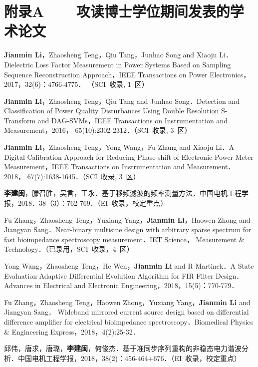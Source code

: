 
\chapter*{附录A~~~~攻读博士学位期间发表的学术论文}
\setlength{\parindent}{0em}
\begin{publist}
	\item \textbf{Jianmin Li}，Zhaosheng Teng，Qiu Tang，Junhao Song and Xiaoju Li．Dielectric Loss Factor Measurement in Power Systems Based on Sampling Sequence Reconstruction Approach，IEEE Transactions on Power Electronics，2017，32(6)：4766-4775． （SCI~收录, 1~区）
	\item \textbf{Jianmin Li}，Zhaosheng Teng，Qiu Tang and Junhao Song．Detection and Classification of Power Quality Disturbances Using Double Resolution S-Transform and DAG-SVMs，IEEE Transactions on Instrumentation and Measurement，2016， 65(10):2302-2312．（SCI~收录, 3~区）
	\item \textbf{Jianmin Li}，Zhaosheng Teng，Yong Wang，Fu Zhang and Xiaoju Li．A Digital Calibration Approach for Reducing Phase-shift of Electronic Power Meter Measurement，IEEE Transactions on Instrumentation and Measurement．2018， 67(7):1638-1645．（SCI~收录, 3~区）
	\item \textbf{李建闽}，滕召胜，吴言，王永．基于移频滤波的频率测量方法．中国电机工程学报，2018．38（3）：762-769．（EI~收录，校定重点）
	\item Fu Zhang，Zhaosheng Teng，Yuxiang Yang，\textbf{Jianmin Li}，Haowen Zhong and Jiangyan Sang．Near-binary multisine design with arbitrary sparse spectrum for fast bioimpedance spectroscopy measurement．IET Science， Measurement \& Technology．（已录用，SCI~收录，4~区）
	\item Yong Wang，Zhaosheng Teng，He Wen，\textbf{Jianmin Li} and R Martinek．A State Evaluation Adaptive Differential Evolution Algorithm for FIR Filter Design．Advances in Electrical and Electronic Engineering，2018，15(5)：770-779．
	\item Fu Zhang，Zhaosheng Teng，Haowen Zhong，Yuxiang Yang，\textbf{Jianmin Li} and Jiangyan Sang． Wideband mirrored current source design based on differential difference amplifier for electrical bioimpedance spectroscopy．Biomedical Physics \& Engineering Express，2018，4(2):25-32．
	\item 邱伟，唐求，唐璐，\textbf{李建闽}，何俊杰．基于准同步序列重构的非稳态电力谐波分析．中国电机工程学报，2018，38(2)：456-464+676．（EI~收录，校定重点）

\end{publist}
